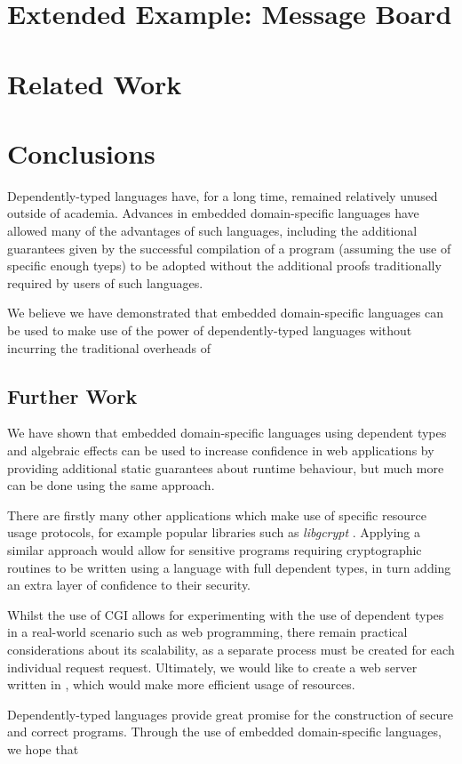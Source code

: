 \documentclass[preprint]{sigplanconf}
\begin{document}
\section{Extended Example: Message Board}
\section{Related Work}
\section{Conclusions}
Dependently-typed languages have, for a long time, remained relatively unused outside of academia. Advances in embedded domain-specific languages have allowed many of the advantages of such languages, including the additional guarantees given by the successful compilation of a program (assuming the use of specific enough tyeps) to be adopted without the additional proofs traditionally required by users of such languages.

We believe we have demonstrated that embedded domain-specific languages can be used to make use of the power of dependently-typed languages without incurring the traditional overheads of 
\subsection{Further Work}
We have shown that embedded domain-specific languages using dependent types and algebraic effects can be used to increase confidence in web applications by providing additional static guarantees about runtime behaviour, but much more can be done using the same approach.

There are firstly many other applications which make use of specific resource usage protocols, for example popular libraries such as \textit{libgcrypt} \cite{libgcrypt}. Applying a similar approach would allow for sensitive programs requiring cryptographic routines to be written using a language with full dependent types, in turn adding an extra layer of confidence to their security. 

Whilst the use of CGI allows for experimenting with the use of dependent types in a real-world scenario such as web programming, there remain practical considerations about its scalability, as a separate process must be created for each individual request request. Ultimately, we would like to create a web server written in \idris{}, which would make more efficient usage of resources. 

Dependently-typed languages provide great promise for the construction of secure and correct programs. Through the use of embedded domain-specific languages, we hope that
\end{document}
